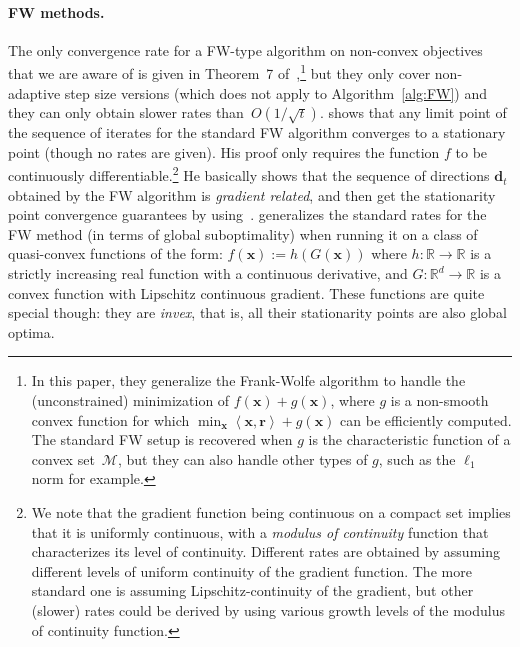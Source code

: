\documentclass{article}
\newcommand{\R}{\mathbb{R}}
\newcommand{\x}{\bm{x}}
\newcommand{\domain}{\mathcal{M}} %
\newcommand{\dd}{\bm{d}}
\renewcommand{\r}{\bm{r}}
\newcommand{\innerProd}[2]{\left\langle #1 , #2 \right\rangle}
\newcommand{\0}{\mathbf{0}} %
\begin{document}
\paragraph{FW methods.} The only convergence rate for a FW-type algorithm on non-convex objectives that we are aware of is given in Theorem~7 of~\citet{yu2014GCG},\footnote{In this paper, they generalize the Frank-Wolfe algorithm to handle the (unconstrained) minimization of $f(\x) + g(\x)$, where $g$ is a non-smooth convex function for which $\min_{\x} \innerProd{\x}{\r} + g(\x)$ can be efficiently computed. The standard FW setup is recovered when $g$ is the characteristic function of a convex set~$\domain$, but they can also handle other types of $g$, such as the $\ell_1$ norm for example.} but they only cover non-adaptive step size versions (which does not apply to Algorithm~\ref{alg:FW}) and they can only obtain slower rates than~$O(1/\sqrt{t})$. 
\citet[Section 2.2]{bertsekas1999nonlinear} shows that any limit point of the sequence of iterates for the standard FW algorithm converges to a stationary point (though no rates are given). His proof only requires the function $f$ to be continuously differentiable.\footnote{We note that the gradient function being continuous on a compact set implies that it is uniformly continuous, with a \emph{modulus of continuity} function that characterizes its level of continuity. Different rates are obtained by assuming different levels of uniform continuity of the gradient function. The more standard one is assuming Lipschitz-continuity of the gradient, but other (slower) rates could be derived by using various growth levels of the modulus of continuity function.} He basically shows that the sequence of directions $\dd_t$ obtained by the FW algorithm is \emph{gradient related}, and then get the stationarity point convergence guarantees by using~\citep[Proposition 2.2.1]{bertsekas1999nonlinear}.
\citet[Note 5.5]{dunn1979rates} generalizes the standard rates for the FW method (in terms of global suboptimality) when running it on a class of quasi-convex functions of the form: $f(\x) := h(G(\x))$ where $h : \R \rightarrow\R$ is a strictly increasing real function with a continuous derivative, and $G : \R^d \rightarrow\R$ is a convex function with Lipschitz continuous gradient. These functions are quite special though: they are \emph{invex}, that is, all their stationarity points are also global optima.
\end{document}
